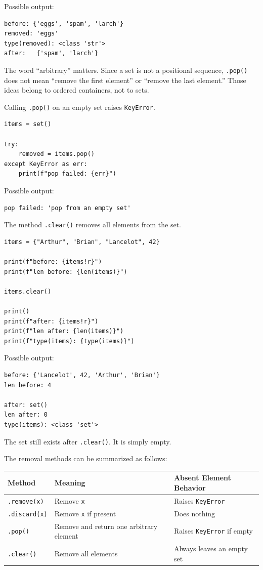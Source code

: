 Possible output:

\begin{verbatim}
before: {'eggs', 'spam', 'larch'}
removed: 'eggs'
type(removed): <class 'str'>
after:   {'spam', 'larch'}
\end{verbatim}

The word ``arbitrary'' matters. Since a set is not a positional sequence, \texttt{.pop()} does not mean ``remove the first element'' or ``remove the last element.'' Those ideas belong to ordered containers, not to sets.

Calling \texttt{.pop()} on an empty set raises \texttt{KeyError}.

\begin{verbatim}
items = set()

try:
    removed = items.pop()
except KeyError as err:
    print(f"pop failed: {err}")
\end{verbatim}

Possible output:

\begin{verbatim}
pop failed: 'pop from an empty set'
\end{verbatim}

The method \texttt{.clear()} removes all elements from the set.

\begin{verbatim}
items = {"Arthur", "Brian", "Lancelot", 42}

print(f"before: {items!r}")
print(f"len before: {len(items)}")

items.clear()

print()
print(f"after: {items!r}")
print(f"len after: {len(items)}")
print(f"type(items): {type(items)}")
\end{verbatim}

Possible output:

\begin{verbatim}
before: {'Lancelot', 42, 'Arthur', 'Brian'}
len before: 4

after: set()
len after: 0
type(items): <class 'set'>
\end{verbatim}

The set still exists after \texttt{.clear()}. It is simply empty.

The removal methods can be summarized as follows:

\begin{center}
\begin{tabular}{lll}
\textbf{Method} & \textbf{Meaning} & \textbf{Absent Element Behavior} \\
\hline
\texttt{.remove(x)} & Remove \texttt{x} & Raises \texttt{KeyError} \\
\texttt{.discard(x)} & Remove \texttt{x} if present & Does nothing \\
\texttt{.pop()} & Remove and return one arbitrary element & Raises \texttt{KeyError} if empty \\
\texttt{.clear()} & Remove all elements & Always leaves an empty set \\
\end{tabular}
\end{center}

